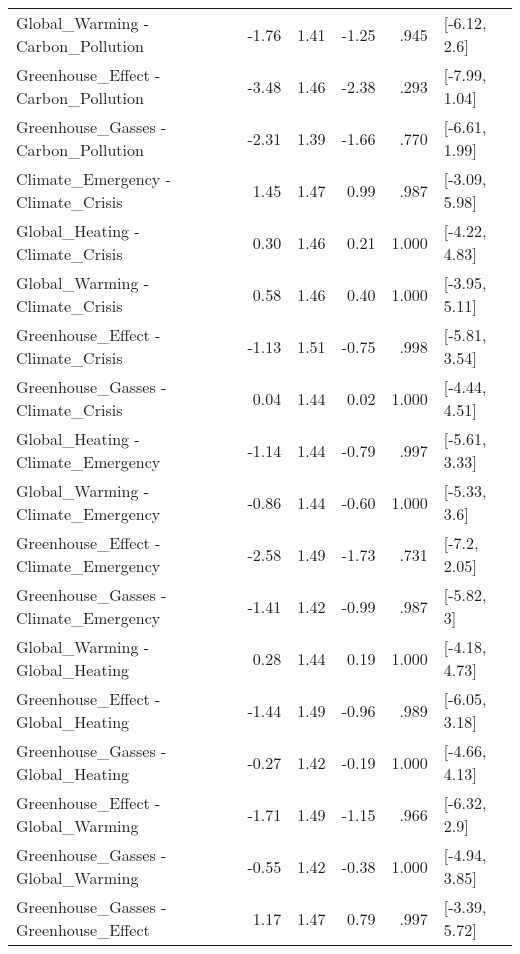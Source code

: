 \begin{table}[ht]
\begin{tabular}{lrrrrl}
  Global\_Warming - Carbon\_Pollution & -1.76 & 1.41 & -1.25 & .945 & [-6.12, 2.6] \\ 
  Greenhouse\_Effect - Carbon\_Pollution & -3.48 & 1.46 & -2.38 & .293 & [-7.99, 1.04] \\ 
  Greenhouse\_Gasses - Carbon\_Pollution & -2.31 & 1.39 & -1.66 & .770 & [-6.61, 1.99] \\ 
  Climate\_Emergency - Climate\_Crisis & 1.45 & 1.47 & 0.99 & .987 & [-3.09, 5.98] \\ 
  Global\_Heating - Climate\_Crisis & 0.30 & 1.46 & 0.21 & 1.000 & [-4.22, 4.83] \\ 
  Global\_Warming - Climate\_Crisis & 0.58 & 1.46 & 0.40 & 1.000 & [-3.95, 5.11] \\ 
  Greenhouse\_Effect - Climate\_Crisis & -1.13 & 1.51 & -0.75 & .998 & [-5.81, 3.54] \\ 
  Greenhouse\_Gasses - Climate\_Crisis & 0.04 & 1.44 & 0.02 & 1.000 & [-4.44, 4.51] \\ 
  Global\_Heating - Climate\_Emergency & -1.14 & 1.44 & -0.79 & .997 & [-5.61, 3.33] \\ 
  Global\_Warming - Climate\_Emergency & -0.86 & 1.44 & -0.60 & 1.000 & [-5.33, 3.6] \\ 
  Greenhouse\_Effect - Climate\_Emergency & -2.58 & 1.49 & -1.73 & .731 & [-7.2, 2.05] \\ 
  Greenhouse\_Gasses - Climate\_Emergency & -1.41 & 1.42 & -0.99 & .987 & [-5.82, 3] \\ 
  Global\_Warming - Global\_Heating & 0.28 & 1.44 & 0.19 & 1.000 & [-4.18, 4.73] \\ 
  Greenhouse\_Effect - Global\_Heating & -1.44 & 1.49 & -0.96 & .989 & [-6.05, 3.18] \\ 
  Greenhouse\_Gasses - Global\_Heating & -0.27 & 1.42 & -0.19 & 1.000 & [-4.66, 4.13] \\ 
  Greenhouse\_Effect - Global\_Warming & -1.71 & 1.49 & -1.15 & .966 & [-6.32, 2.9] \\ 
  Greenhouse\_Gasses - Global\_Warming & -0.55 & 1.42 & -0.38 & 1.000 & [-4.94, 3.85] \\ 
  Greenhouse\_Gasses - Greenhouse\_Effect & 1.17 & 1.47 & 0.79 & .997 & [-3.39, 5.72] \\ 
   \hline
\end{tabular}
\end{table}
